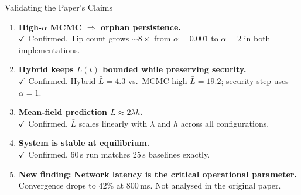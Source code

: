 \documentclass[aspectratio=169]{beamer}
\begin{document}
\begin{frame}{Validating the Paper's Claims}
  \begin{enumerate}
    \item \textbf{High-$\alpha$ MCMC $\Rightarrow$ orphan persistence.}\\
      {\color{green!60!black}$\checkmark$ Confirmed.}
      Tip count grows ${\sim}8\times$ from $\alpha\!=\!0.001$ to $\alpha\!=\!2$ in both implementations.

    \bigskip
    \item \textbf{Hybrid keeps $L(t)$ bounded while preserving security.}\\
      {\color{green!60!black}$\checkmark$ Confirmed.}
      Hybrid $\bar L\!=\!4.3$ vs.\ MCMC-high $\bar L\!=\!19.2$; security step uses $\alpha\!=\!1$.

    \bigskip
    \item \textbf{Mean-field prediction $L \approx 2\lambda h$.}\\
      {\color{green!60!black}$\checkmark$ Confirmed.}
      $\bar L$ scales linearly with $\lambda$ and $h$ across all configurations.

    \bigskip
    \item \textbf{System is stable at equilibrium.}\\
      {\color{green!60!black}$\checkmark$ Confirmed.}
      60\,s run matches 25\,s baselines exactly.

    \bigskip
    \item {\color{orange}\textbf{New finding:}} \textbf{Network latency is the critical operational parameter.}\\
      Convergence drops to 42\% at 800\,ms.  Not analysed in the original paper.
  \end{enumerate}
\end{frame}
\end{document}

